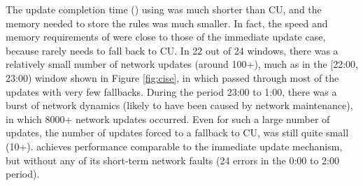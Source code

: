 {%
The update completion time () using \name was much shorter
than CU, and the memory
needed to store the rules was much smaller.
In fact, the speed and memory requirements of \name 
were close to those of the immediate update case, because
\name rarely needs to fall back to CU. In 22 out of 24
windows, there was a relatively small number of network updates (around 100+),
much as in the [22:00, 23:00) window shown in Figure \ref{fig:cise},
in which \name
passed through most of the updates with very few fallbacks. During the period 23:00
to 1:00, there was a burst of network dynamics (likely to have been 
caused by network maintenance), in which 8000+ network
updates occurred. Even for such a large number of updates, the
number of updates forced to a fallback to CU, was still quite small (10+).
\name achieves performance comparable to the immediate update mechanism, but without
any of its short-term network faults (24 errors in the 0:00 to 2:00 period).

}



